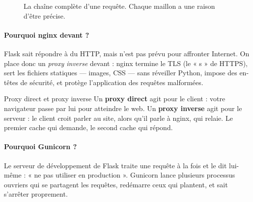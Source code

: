 \begin{figure}[htbp]
\centering
{}
\caption{La chaîne complète d'une requête. Chaque maillon a une raison d'être
précise.}
\end{figure}

\paragraph{Pourquoi nginx devant ?} Flask sait répondre à du HTTP, mais n'est
pas prévu pour affronter Internet. On place donc un \emph{proxy inverse}
devant : nginx termine le TLS (le « s » de HTTPS), sert les fichiers statiques
--- images, CSS --- sans réveiller Python, impose des en-têtes de sécurité, et
protège l'application des requêtes malformées.

\begin{notion}{Proxy direct et proxy inverse}
Un \textbf{proxy direct} agit pour le client : votre navigateur passe par lui
pour atteindre le web. Un \textbf{proxy inverse} agit pour le serveur : le
client croit parler au site, alors qu'il parle à nginx, qui relaie. Le premier
cache qui demande, le second cache qui répond.
\end{notion}

\paragraph{Pourquoi Gunicorn ?} Le serveur de développement de Flask traite une
requête à la fois et le dit lui-même : « ne pas utiliser en production ».
Gunicorn lance plusieurs processus ouvriers qui se partagent les requêtes,
redémarre ceux qui plantent, et sait s'arrêter proprement.

